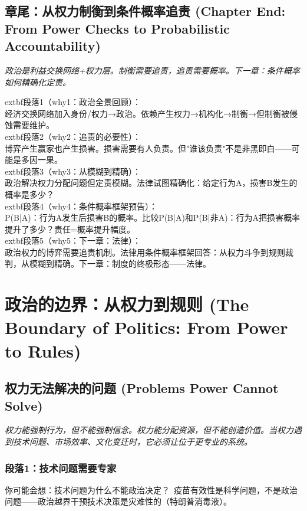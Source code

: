 \documentclass[a4paper,12pt]{book}
\newenvironment{motivation}{\begin{tcolorbox}[colback=gray!10,colframe=gray!60,title=\textit{动机}]\small\itshape}{\end{tcolorbox}}
\begin{document}
\begin{motivation}
\begin{motivation}
\begin{motivation}
	\subsection{章尾：从权力制衡到条件概率追责 (Chapter End: From Power Checks to Probabilistic Accountability)}
	\begin{motivation}政治是利益交换网络+权力层。制衡需要追责，追责需要概率。下一章：条件概率如何精确化定责。\end{motivation}
		extbf{段落1（why1：政治全景回顾）}：\\经济交换网络加入身份/权力→政治。依赖产生权力→机构化→制衡→但制衡被侵蚀需要维护。\\	extbf{段落2（why2：追责的必要性）}：\\博弈产生赢家也产生损害。损害需要有人负责。但"谁该负责"不是非黑即白——可能是多因一果。\\	extbf{段落3（why3：从模糊到精确）}：\\政治解决权力分配问题但定责模糊。法律试图精确化：给定行为A，损害B发生的概率是多少？\\	extbf{段落4（why4：条件概率框架预告）}：\\P(B|A)：行为A发生后损害B的概率。比较P(B|A)和P(B|非A)：行为A把损害概率提升了多少？责任=概率提升幅度。\\	extbf{段落5（why5：下一章：法律）}：\\政治权力的博弈需要追责机制。法律用条件概率框架回答：从权力斗争到规则裁判，从模糊到精确。下一章：制度的终极形态——法律。


	\section{政治的边界：从权力到规则 (The Boundary of Politics: From Power to Rules)}

	\subsection{权力无法解决的问题 (Problems Power Cannot Solve)}
	\begin{motivation}
		权力能强制行为，但不能强制信念。权力能分配资源，但不能创造价值。当权力遇到技术问题、市场效率、文化变迁时，它必须让位于更专业的系统。
	\end{motivation}

	\subsubsection*{段落1：技术问题需要专家}

	\begin{tcolorbox}[colback=yellow!5, title=\textit{读者行为预测}]
		你可能会想：技术问题为什么不能政治决定？\ 疫苗有效性是科学问题，不是政治问题——政治越界干预技术决策是灾难性的（特朗普消毒液）。
	\end{tcolorbox}


\end{motivation}
\end{motivation}
\end{motivation}
\end{document}
